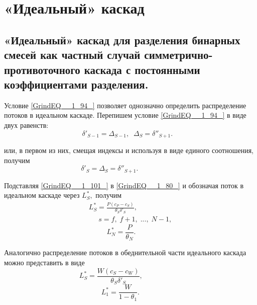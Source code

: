 \section{«Идеальный» каскад}

\subsection{«Идеальный» каскад для разделения бинарных смесей как частный случай симметрично-противоточного каскада с постоянными коэффициентами разделения.}



Условие \ref{GrindEQ__1_94_} позволяет однозначно определить распределение потоков в идеальном каскаде. Перепишем условие \ref{GrindEQ__1_94_} в виде двух равенств:
\begin{equation} \label{GrindEQ__1_100_} 
\delta '_{S-1} =\Delta _{S-1} ,\; \; \Delta _{S} =\delta ''_{S+1} .~~~                         ~ 
\end{equation} 

или, в первом из них, смещая индексы и используя  в виде единого соотношения, получим
\begin{equation} \label{GrindEQ__1_101_} 
\delta '_{S} =\Delta _{S} =\delta ''_{S+1} .~~~~~~~~~~~            ~~~~~~~~~~~~~~~~ 
\end{equation} 

Подставляя \ref{GrindEQ__1_101_} в \ref{GrindEQ__1_80_} и обозначая поток в идеальном каскаде через $L_{S}^{*} ,$ получим
\begin{equation} \label{GrindEQ__1_102_} 
\begin{array}{l} {L_{S}^{*} =\frac{P(c_{P} -c_{S} )}{\theta _{S} \delta '_{S} } ,} \\ {\; \; \; \; \; s=f,\; f+1,\; ...,\; N-1,} \end{array} 
\end{equation} 
\begin{equation} \label{GrindEQ__1_103_} 
L_{N}^{*} =\frac{P}{\theta _{N} } .  ~~~~~              ~~~~~~~ 
\end{equation} 

Аналогично распределение потоков в обеднительной части идеального каскада можно представить в виде
\begin{equation} \label{GrindEQ__1_104_} 
L_{S}^{*} =\frac{W(c_{S} -c_{W} )}{\theta _{S} \delta '_{S} } ,~~~~~~~~~~~~~~~~~~~~        ~~~~~ 
\end{equation} 
\begin{equation} \label{GrindEQ__1_105_} 
L_{1}^{*} =\frac{W}{1-\theta _{1} } .  ~~~             ~~~~~~~~~~ 
\end{equation} 

